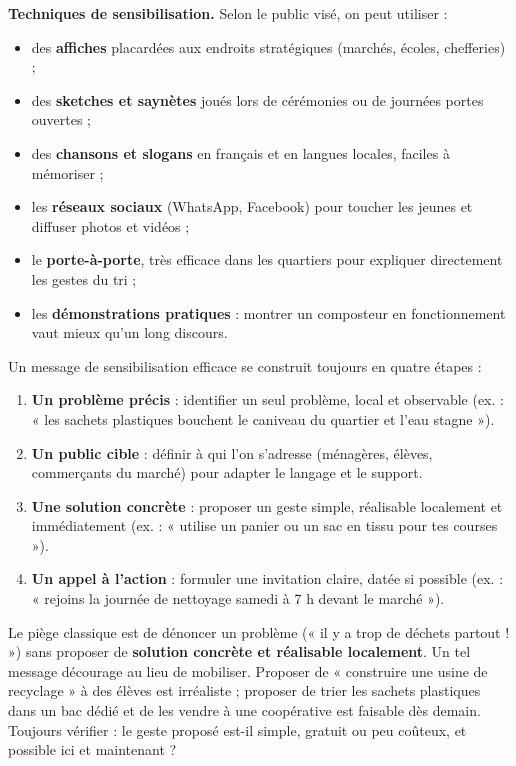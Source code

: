 \documentclass[11pt]{article}
\begin{document}
\textbf{Techniques de sensibilisation.} Selon le public visé, on peut utiliser :
\begin{itemize}
\item des \textbf{affiches} placardées aux endroits stratégiques (marchés, écoles, chefferies) ;
\item des \textbf{sketches et saynètes} joués lors de cérémonies ou de journées portes ouvertes ;
\item des \textbf{chansons et slogans} en français et en langues locales, faciles à mémoriser ;
\item les \textbf{réseaux sociaux} (WhatsApp, Facebook) pour toucher les jeunes et diffuser photos et vidéos ;
\item le \textbf{porte-à-porte}, très efficace dans les quartiers pour expliquer directement les gestes du tri ;
\item les \textbf{démonstrations pratiques} : montrer un composteur en fonctionnement vaut mieux qu'un long discours.
\end{itemize}

\begin{methode}
Un message de sensibilisation efficace se construit toujours en quatre étapes :
\begin{enumerate}
\item \textbf{Un problème précis} : identifier un seul problème, local et observable (ex. : « les sachets plastiques bouchent le caniveau du quartier et l'eau stagne »).
\item \textbf{Un public cible} : définir à qui l'on s'adresse (ménagères, élèves, commerçants du marché) pour adapter le langage et le support.
\item \textbf{Une solution concrète} : proposer un geste simple, réalisable localement et immédiatement (ex. : « utilise un panier ou un sac en tissu pour tes courses »).
\item \textbf{Un appel à l'action} : formuler une invitation claire, datée si possible (ex. : « rejoins la journée de nettoyage samedi à 7 h devant le marché »).
\end{enumerate}
\end{methode}

\begin{attention}
Le piège classique est de dénoncer un problème (« il y a trop de déchets partout ! ») sans proposer de \textbf{solution concrète et réalisable localement}. Un tel message décourage au lieu de mobiliser. Proposer de « construire une usine de recyclage » à des élèves est irréaliste ; proposer de trier les sachets plastiques dans un bac dédié et de les vendre à une coopérative est faisable dès demain. Toujours vérifier : le geste proposé est-il simple, gratuit ou peu coûteux, et possible ici et maintenant ?
\end{attention}
\end{document}
